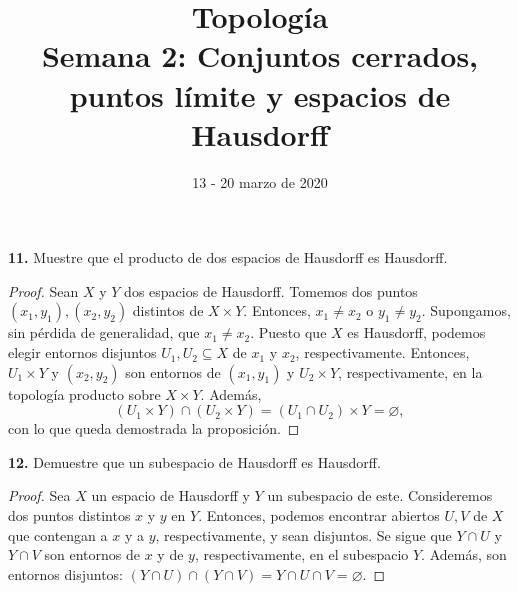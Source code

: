 \documentclass{article}
\begin{document}
\date{13 - 20 marzo de 2020}
\title{ \textbf{Topología} \\
Semana 2: Conjuntos cerrados, puntos límite y espacios de Hausdorff}
\maketitle	

\begin{mybox}
\textbf{11. } Muestre que el producto de dos espacios de Hausdorff es Hausdorff. 	
\end{mybox}	
\begin{proof}
	Sean $X$ y $Y$ dos espacios de Hausdorff. Tomemos dos puntos $(x_{1}, y_{1}), (x_{2}, y_{2})$ distintos de $X \times Y$. Entonces, $x_{1} \neq x_{2}$ o $y_{1} \neq y_{2}$. Supongamos, sin pérdida de generalidad, que $x_{1} \neq x_{2}$. Puesto que $X$ es Hausdorff, podemos elegir entornos disjuntos $U_{1}, U_{2} \subseteq X$ de $x_{1}$ y $x_{2}$, respectivamente.  Entonces, $U_{1} \times Y$ y $(x_{2}, y_{2})$ son entornos de $(x_{1}, y_{1})$ y $U_{2} \times Y$, respectivamente, en la topología producto sobre $X \times Y$. Además, 
	$$ \left( U_{1} \times Y \right) \cap \left( U_{2} \times Y \right) =   \left( U_{1} \cap U_{2} \right) \times Y = \varnothing, $$
	con lo que queda demostrada la proposición. 
\end{proof}

\begin{mybox}
	\textbf{12. } Demuestre que un subespacio de Hausdorff es Hausdorff. 
\end{mybox}	
\begin{proof}
	Sea $X$ un espacio de Hausdorff y $Y$ un subespacio de este. Consideremos dos puntos distintos $x$ y $y$ en $Y$. Entonces, podemos encontrar abiertos $U, V$ de $X$ que contengan a $x$ y a $y$, respectivamente, y sean disjuntos. Se sigue que $Y \cap U$ y $Y \cap V$ son entornos de $x$ y de $y$, respectivamente, en el subespacio $Y$. Además, son entornos disjuntos: $(Y \cap U) \cap (Y \cap V) = Y \cap U \cap V = \varnothing.$
\end{proof}
\end{document}
